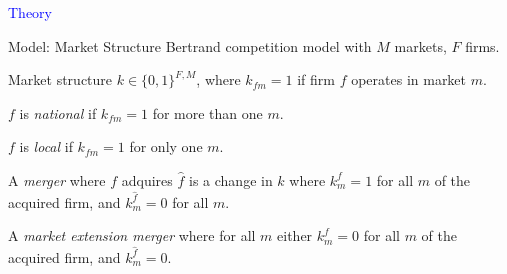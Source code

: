 \documentclass[notes,10.2pt, aspectratio=169]{beamer}
\newenvironment{wideitemize}{\itemize\addtolength{\itemsep}{10pt}}{\enditemize}
\begin{document}
    







\begin{frame}[noframenumbering]
    \textcolor{blue}{\huge{\centerline{Theory}}}

\end{frame}





\begin{frame}{Model: Market Structure}
    \vspace{0.2cm}
Bertrand competition model with $M$ markets, $F$ firms.
\vspace{0.2cm}
\begin{wideitemize}
    \item Market structure $k \in \{ 0, 1\}^{F,M}$, where $k_{f m}=1$ if firm $f$ operates in market $m$. 
    \item $f$ is \textit{national} if $k_{f m}=1$ for more than one $m$.
    \item $f$ is \textit{local} if $k_{f m}=1$ for only one $m$.
    \item A \textit{merger} where $f$ adquires $\hat{f}$ is a change in $k$ where $k^f_m=1$ for all $m$ of the acquired firm, and $k^{\hat{f}}_m=0$ for all $m$.
    \item A \textit{market extension merger} where for all $m$ either $k^f_m=0$ for all $m$ of the acquired firm, and $k^{\hat{f}}_m=0$.

\end{wideitemize}

    \end{frame}
    
\end{document}
